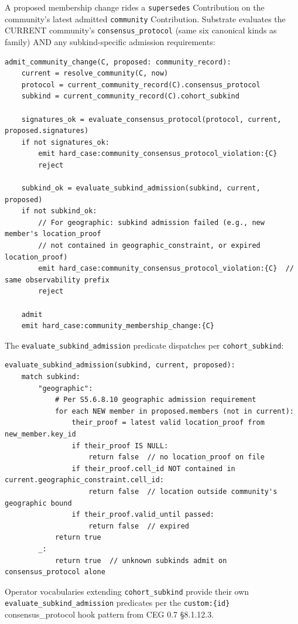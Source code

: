 \documentclass[10pt]{article}
\begin{document}
A proposed membership change rides a \texttt{supersedes} Contribution on the community's latest admitted \texttt{community} Contribution. Substrate evaluates the CURRENT community's \texttt{consensus\_protocol} (same six canonical kinds as family) AND any subkind-specific admission requirements:


\begin{lstlisting}
admit_community_change(C, proposed: community_record):
    current = resolve_community(C, now)
    protocol = current_community_record(C).consensus_protocol
    subkind = current_community_record(C).cohort_subkind

    signatures_ok = evaluate_consensus_protocol(protocol, current, proposed.signatures)
    if not signatures_ok:
        emit hard_case:community_consensus_protocol_violation:{C}
        reject

    subkind_ok = evaluate_subkind_admission(subkind, current, proposed)
    if not subkind_ok:
        // For geographic: subkind admission failed (e.g., new member's location_proof
        // not contained in geographic_constraint, or expired location_proof)
        emit hard_case:community_consensus_protocol_violation:{C}  // same observability prefix
        reject

    admit
    emit hard_case:community_membership_change:{C}
\end{lstlisting}

The \texttt{evaluate\_subkind\_admission} predicate dispatches per \texttt{cohort\_subkind}:


\begin{lstlisting}
evaluate_subkind_admission(subkind, current, proposed):
    match subkind:
        "geographic":
            # Per S5.6.8.10 geographic admission requirement
            for each NEW member in proposed.members (not in current):
                their_proof = latest valid location_proof from new_member.key_id
                if their_proof IS NULL:
                    return false  // no location_proof on file
                if their_proof.cell_id NOT contained in current.geographic_constraint.cell_id:
                    return false  // location outside community's geographic bound
                if their_proof.valid_until passed:
                    return false  // expired
            return true
        _:
            return true  // unknown subkinds admit on consensus_protocol alone
\end{lstlisting}

Operator vocabularies extending \texttt{cohort\_subkind} provide their own \texttt{evaluate\_subkind\_admission} predicates per the \texttt{custom:\{id\}} consensus\_protocol hook pattern from CEG 0.7 §8.1.12.3.
\end{document}
